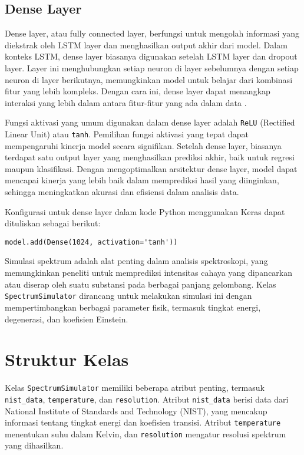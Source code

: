 \subsection{Dense Layer}
\par Dense layer, atau fully connected layer, berfungsi untuk mengolah informasi yang diekstrak oleh LSTM layer dan menghasilkan output akhir dari model. Dalam konteks LSTM, dense layer biasanya digunakan setelah LSTM layer dan dropout layer. Layer ini menghubungkan setiap neuron di layer sebelumnya dengan setiap neuron di layer berikutnya, memungkinkan model untuk belajar dari kombinasi fitur yang lebih kompleks. Dengan cara ini, dense layer dapat menangkap interaksi yang lebih dalam antara fitur-fitur yang ada dalam data \parencite{zhang2019}.

\par Fungsi aktivasi yang umum digunakan dalam dense layer adalah \texttt{ReLU} (Rectified Linear Unit) atau \texttt{tanh}. Pemilihan fungsi aktivasi yang tepat dapat mempengaruhi kinerja model secara signifikan. Setelah dense layer, biasanya terdapat satu output layer yang menghasilkan prediksi akhir, baik untuk regresi maupun klasifikasi. Dengan mengoptimalkan arsitektur dense layer, model dapat mencapai kinerja yang lebih baik dalam memprediksi hasil yang diinginkan, sehingga meningkatkan akurasi dan efisiensi dalam analisis data.

\par Konfigurasi untuk dense layer dalam kode Python menggunakan Keras dapat dituliskan sebagai berikut:
    
\lstinline[]|model.add(Dense(1024, activation='tanh'))|
  

\par Simulasi spektrum adalah alat penting dalam analisis spektroskopi, yang memungkinkan peneliti untuk memprediksi intensitas cahaya yang dipancarkan atau diserap oleh suatu substansi pada berbagai panjang gelombang. Kelas \texttt{SpectrumSimulator} dirancang untuk melakukan simulasi ini dengan mempertimbangkan berbagai parameter fisik, termasuk tingkat energi, degenerasi, dan koefisien Einstein.

\section{Struktur Kelas}
\par Kelas \texttt{SpectrumSimulator} memiliki beberapa atribut penting, termasuk \texttt{nist\_data}, \texttt{temperature}, dan \texttt{resolution}. Atribut \texttt{nist\_data} berisi data dari National Institute of Standards and Technology (NIST), yang mencakup informasi tentang tingkat energi dan koefisien transisi. Atribut \texttt{temperature} menentukan suhu dalam Kelvin, dan \texttt{resolution} mengatur resolusi spektrum yang dihasilkan.

